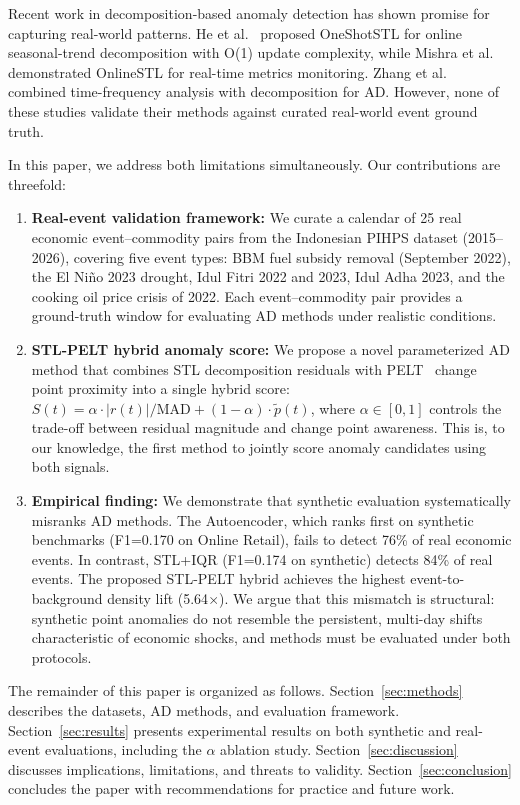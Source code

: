 \documentclass[10pt]{article}
\begin{document}
Recent work in decomposition-based anomaly detection has shown promise for capturing real-world patterns. He et al.~\cite{he2023oneshotstl} proposed OneShotSTL for online seasonal-trend decomposition with O(1) update complexity, while Mishra et al.~\cite{mishra2022onlinestl} demonstrated OnlineSTL for real-time metrics monitoring. Zhang et al.~\cite{zhang2022tfad} combined time-frequency analysis with decomposition for AD. However, none of these studies validate their methods against curated real-world event ground truth.

In this paper, we address both limitations simultaneously. Our contributions are threefold:

\begin{enumerate}[leftmargin=*]
    \item \textbf{Real-event validation framework:} We curate a calendar of 25 real economic event--commodity pairs from the Indonesian PIHPS dataset (2015--2026), covering five event types: BBM fuel subsidy removal (September 2022), the El Ni\~no 2023 drought, Idul Fitri 2022 and 2023, Idul Adha 2023, and the cooking oil price crisis of 2022. Each event--commodity pair provides a ground-truth window for evaluating AD methods under realistic conditions.
    \item \textbf{STL-PELT hybrid anomaly score:} We propose a novel parameterized AD method that combines STL decomposition residuals with PELT~\cite{killick2012pelt} change point proximity into a single hybrid score: $S(t) = \alpha \cdot |r(t)|/\text{MAD} + (1-\alpha) \cdot \tilde{p}(t)$, where $\alpha \in [0,1]$ controls the trade-off between residual magnitude and change point awareness. This is, to our knowledge, the first method to jointly score anomaly candidates using both signals.
    \item \textbf{Empirical finding:} We demonstrate that synthetic evaluation systematically misranks AD methods. The Autoencoder, which ranks first on synthetic benchmarks (F1=0.170 on Online Retail), fails to detect 76\% of real economic events. In contrast, STL+IQR (F1=0.174 on synthetic) detects 84\% of real events. The proposed STL-PELT hybrid achieves the highest event-to-background density lift (5.64$\times$). We argue that this mismatch is structural: synthetic point anomalies do not resemble the persistent, multi-day shifts characteristic of economic shocks, and methods must be evaluated under both protocols.
\end{enumerate}

The remainder of this paper is organized as follows. Section~\ref{sec:methods} describes the datasets, AD methods, and evaluation framework. Section~\ref{sec:results} presents experimental results on both synthetic and real-event evaluations, including the $\alpha$ ablation study. Section~\ref{sec:discussion} discusses implications, limitations, and threats to validity. Section~\ref{sec:conclusion} concludes the paper with recommendations for practice and future work.
\end{document}

